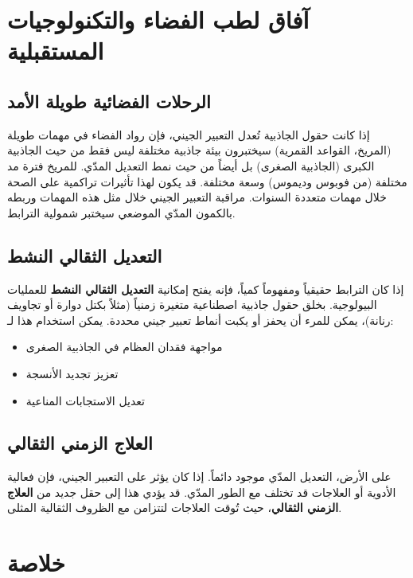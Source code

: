 \documentclass[11pt,a4paper]{article}
\theoremstyle{remark}
\begin{document}
	\section{آفاق لطب الفضاء والتكنولوجيات المستقبلية}
	\label{sec:applications}
	
	\subsection{الرحلات الفضائية طويلة الأمد}
	
	إذا كانت حقول الجاذبية تُعدل التعبير الجيني، فإن رواد الفضاء في مهمات طويلة (المريخ، القواعد القمرية) سيختبرون بيئة جاذبية مختلفة ليس فقط من حيث الجاذبية الكبرى (الجاذبية الصغرى) بل أيضاً من حيث نمط التعديل المدّي. للمريخ فترة مد مختلفة (من فوبوس وديموس) وسعة مختلفة. قد يكون لهذا تأثيرات تراكمية على الصحة خلال مهمات متعددة السنوات. مراقبة التعبير الجيني خلال مثل هذه المهمات وربطه بالكمون المدّي الموضعي سيختبر شمولية الترابط.
	
	\subsection{التعديل الثقالي النشط}
	
	إذا كان الترابط حقيقياً ومفهوماً كمياً، فإنه يفتح إمكانية \textbf{التعديل الثقالي النشط} للعمليات البيولوجية. بخلق حقول جاذبية اصطناعية متغيرة زمنياً (مثلاً بكتل دوارة أو تجاويف رنانة)، يمكن للمرء أن يحفز أو يكبت أنماط تعبير جيني محددة. يمكن استخدام هذا لـ:
	\begin{itemize}
		\item مواجهة فقدان العظام في الجاذبية الصغرى
		\item تعزيز تجديد الأنسجة
		\item تعديل الاستجابات المناعية
	\end{itemize}
	
	\subsection{العلاج الزمني الثقالي}
	
	على الأرض، التعديل المدّي موجود دائماً. إذا كان يؤثر على التعبير الجيني، فإن فعالية الأدوية أو العلاجات قد تختلف مع الطور المدّي. قد يؤدي هذا إلى حقل جديد من \textbf{العلاج الزمني الثقالي}، حيث تُوقت العلاجات لتتزامن مع الظروف الثقالية المثلى.
	
	\section{خلاصة}
	\label{sec:conclusion}
	
\end{document}

